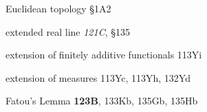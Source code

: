 

Euclidean topology \S1A2


































extended real line {\it 121C}, \S135



extension of finitely additive functionals 113Yi



extension of measures 113Yc, 113Yh, 132Yd

















\indexmedskip















Fatou's Lemma {\bf 123B}, 133Kb, 135Gb, 135Hb




















